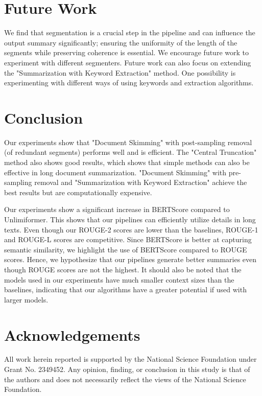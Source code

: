 \documentclass[letterpaper]{article} %
\begin{document}
\section{Future Work}

We find that segmentation is a crucial step in the pipeline and can influence the output summary significantly; ensuring the uniformity of the length of the segments while preserving coherence is essential.
We encourage future work to experiment with different segmenters.
Future work can also focus on extending the "Summarization with Keyword Extraction" method.
One possibility is experimenting with different ways of using keywords and extraction algorithms.


\section{Conclusion}

Our experiments show that "Document Skimming" with post-sampling removal (of redundant segments) performs well and is efficient.
The "Central Truncation" method also shows good results, which shows that simple methods can also be effective in long document summarization.
"Document Skimming" with pre-sampling removal and "Summarization with Keyword Extraction" achieve the best results but are computationally expensive.

Our experiments show a significant increase in BERTScore compared to Unlimiformer.
This shows that our pipelines can efficiently utilize details in long texts.
Even though our ROUGE-2 scores are lower than the baselines, ROUGE-1 and ROUGE-L scores are competitive.
Since BERTScore is better at capturing semantic similarity, we highlight the use of BERTScore compared to ROUGE scores.
Hence, we hypothesize that our pipelines generate better summaries even though ROUGE scores are not the highest.
It should also be noted that the models used in our experiments have much smaller context sizes than the baselines, indicating that our algorithms have a greater potential if used with larger models.


\section*{Acknowledgements}

All work herein reported is supported by the National Science Foundation under Grant No. 2349452.
Any opinion, finding, or conclusion in this study is that of the authors and does not necessarily reflect the views of the National Science Foundation.



\end{document}

